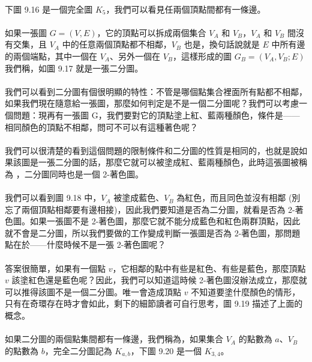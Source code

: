 \documentclass[12pt,a4paper,oneside]{report}
\begin{document}
\begin{CJK}{UTF8}{bkai}
\paragraph{}下圖 9.16 是一個完全圖 $K_5$，我們可以看見任兩個頂點間都有一條邊。
\paragraph{}如果一張圖 $G=(V,E)$，它的頂點可以拆成兩個集合 $V_A$ 和 $V_B$，$V_A$ 和 $V_B$ 間沒有交集，且 $V_A$ 中的任意兩個頂點都不相鄰，$V_B$ 也是，換句話說就是 $E$ 中所有邊的兩個端點，其中一個在 $V_A$、另外一個在 $V_B$，這樣形成的圖 $G_B=(V_A,V_B;E)$ 我們稱\textbf{}，如圖 9.17 就是一張二分圖。
\paragraph{}我們可以看到二分圖有個很明顯的特性：不管是哪個點集合裡面所有點都不相鄰，如果我們現在隨意給一張圖，那麼如何判定是不是一個二分圖呢？我們可以考慮一個問題：現再有一張圖 G，我們要對它的頂點塗上紅、藍兩種顏色，條件是------相同顏色的頂點不相鄰，問可不可以有這種著色呢？
\paragraph{}我們可以很清楚的看到這個問題的限制條件和二分圖的性質是相同的，也就是說如果該圖是一張二分圖的話，那麼它就可以被塗成紅、藍兩種顏色，此時這張圖被稱為 \textbf{}，二分圖同時也是一個 2-著色圖。
\paragraph{}我們可以看到圖 9.18 中，$V_A$ 被塗成藍色、$V_B$ 為紅色，而且同色並沒有相鄰 (別忘了兩個頂點相鄰要有邊相接)，因此我們要知道是否為二分圖，就看是否為 2-著色圖。如果一張圖不是 2-著色圖，那麼它就不能分成藍色和紅色兩群頂點，因此就不會是二分圖，所以我們要做的工作變成判斷一張圖是否為 2-著色圖，那問題點在於------什麼時候不是一張 2-著色圖呢？
\paragraph{}答案很簡單，如果有一個點 $v$，它相鄰的點中有些是紅色、有些是藍色，那麼頂點 $v$ 該塗紅色還是藍色呢？因此，我們可以知道這時候 2-著色圖沒辦法成立，那麼就可以推得該圖不是一個二分圖。唯一會造成頂點 $v$ 不知道要塗什麼顏色的情形，只有在奇環存在時才會如此，剩下的細節讀者可自行思考，圖 9.19 描述了上面的概念。
\paragraph{}如果二分圖的兩個點集間都有一條邊，我們稱為\textbf{}，如果集合 $V_A$ 的點數為 $a$、$V_B$ 的點數為 $b$，完全二分圖記為 $K_{a,b}$，下圖 9.20 是一個 $K_{3,4}$。


\end{CJK}
\end{document}
